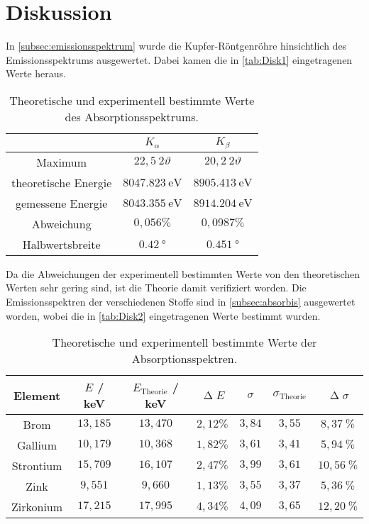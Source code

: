 \section{Diskussion}
\label{sec:Diskussion}
In \autoref{subsec:emissionsspektrum} wurde die Kupfer-Röntgenröhre hinsichtlich des Emissionsspektrums ausgewertet. Dabei kamen die in \autoref{tab:Disk1} eingetragenen Werte heraus.

\begin{table}[H]
    \caption{Theoretische und experimentell bestimmte Werte des Absorptionsspektrums.}
    \label{tab:Disk1}
    \centering
    \begin{tabular}{c c c}
        \toprule
         & $K_\alpha$ & $K_\beta$\\
        \midrule
        Maximum & $22,5 ~ 2\vartheta$ & $20,2 ~ 2\vartheta$ \\
        theoretische Energie & $\SI{8047,823}{\eV}$ & $\SI{8905,413}{\eV}$ \\
        gemessene Energie & $\SI{8043,355}{\eV}$ & $\SI{8914,204}{\eV}$ \\
        Abweichung & $0,056 \%$ & $0,0987 \%$ \\
        Halbwertsbreite & $\SI{0,42}{\degree}$ & $\SI{0,451}{\degree}$ \\
        \bottomrule
    \end{tabular}
\end{table}
Da die Abweichungen der experimentell bestimmten Werte von den theoretischen Werten \cite{NistXray} \cite{Abschirmkonstanten} sehr gering sind, ist die Theorie damit verifiziert worden.\newline
Die Emissionsspektren der verschiedenen Stoffe sind in \autoref{subsec:absorbis} ausgewertet worden, wobei die in \autoref{tab:Disk2} eingetragenen Werte bestimmt wurden.
\begin{table}[H]
    \caption{Theoretische und experimentell bestimmte Werte der Absorptionsspektren.}
    \centering
    \label{tab:Disk2}
    \begin{tabular}{c| c c c c c c}
        \toprule
        Element  & $E$ / keV & $E_{\text{Theorie}}$ / keV & $\upDelta E$ & $\sigma$ & $\sigma_{\text{Theorie}}$ & $\upDelta \sigma$ \\
        \midrule
        Brom      & $13,185$  & $13,470$  & $2,12 \%$ & $3,84$ & $3,55$ & $8,37   ~\%$ \\
        Gallium   & $10,179$  & $10,368$  & $1,82 \%$ & $3,61$ & $3,41$ & $5,94  ~\%$ \\
        Strontium & $15,709$  & $16,107$  & $2,47 \%$ & $3,99$ & $3,61$ & $10,56 ~\%$ \\
        Zink      & $9,551$   & $9,660$   & $1,13 \%$ & $3,55$ & $3,37$ & $5,36  ~\%$ \\
        Zirkonium & $17,215$  & $17,995$  & $4,34 \%$ & $4,09$ & $3,65$ & $12,20 ~\%$ \\
        \bottomrule
    \end{tabular}
\end{table}
